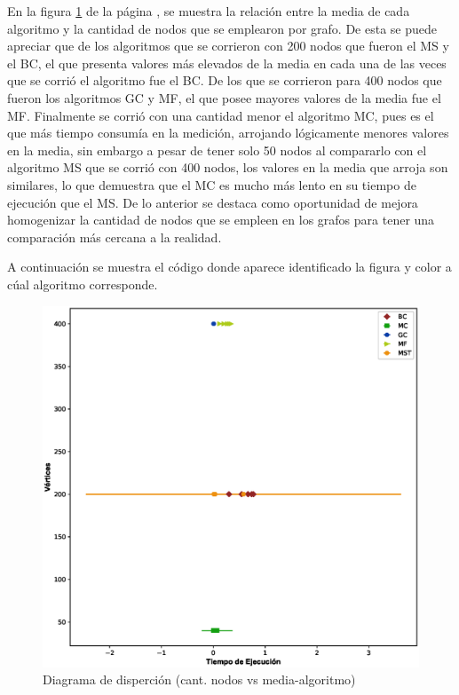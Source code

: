 \documentclass{article}
\begin{document}
En la figura \ref{fig:Fig2} de la página \pageref{fig:Fig2}, se muestra la relación entre la media de cada algoritmo y la cantidad de nodos que se emplearon por grafo. De esta se puede apreciar que de los algoritmos que se corrieron con 200 nodos que fueron el MS y el BC, el que presenta valores más elevados de la media en cada una de las veces que se corrió el algoritmo fue el BC. De los que se corrieron para 400 nodos que fueron los algoritmos GC y MF, el que posee mayores valores de la media fue el MF. Finalmente se corrió con una cantidad menor el algoritmo MC, pues es el que más tiempo consumía en la medición, arrojando lógicamente menores valores en la media, sin embargo a pesar de tener solo 50 nodos al compararlo con el algoritmo MS que se corrió con 400 nodos, los valores en la media que arroja son similares, lo que demuestra que el MC es mucho más lento en su tiempo de ejecución que el MS. De lo anterior se destaca como oportunidad de mejora homogenizar la cantidad de nodos que se empleen en los grafos para tener una comparación más cercana a la realidad.

A continuación se muestra el código donde aparece identificado la figura y color a cúal algoritmo corresponde.



\newpage
\begin{figure}[htbp]
   
    \includegraphics[scale=0.6]{Imagenes/Fig2.eps}
    \caption{Diagrama de disperción (cant. nodos vs media-algoritmo)}
    \label{fig:Fig2}
\end{figure}
\end{document}

